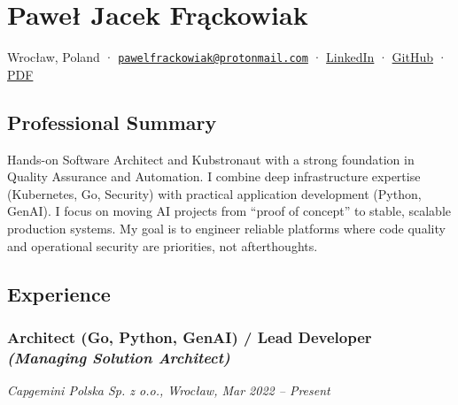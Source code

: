 \documentclass[10pt,a4paper]{article}
\begin{document}
\section{Paweł Jacek Frąckowiak}\label{paweux142-jacek-frux105ckowiak}

Wrocław, Poland ·
\href{mailto:pawelfrackowiak@protonmail.com}{\nolinkurl{pawelfrackowiak@protonmail.com}}
· \href{https://linkedin.com/in/pawelfrackowiak}{LinkedIn} ·
\href{https://github.com/pfrack}{GitHub} · \href{files/cv.pdf}{PDF}

\subsection{Professional Summary}\label{professional-summary}

Hands-on Software Architect and Kubstronaut with a strong foundation in
Quality Assurance and Automation. I combine deep infrastructure
expertise (Kubernetes, Go, Security) with practical application
development (Python, GenAI). I focus on moving AI projects from ``proof
of concept'' to stable, scalable production systems. My goal is to
engineer reliable platforms where code quality and operational security
are priorities, not afterthoughts.

\subsection{Experience}\label{experience}

\subsubsection{\texorpdfstring{Architect (Go, Python, GenAI) / Lead
Developer \emph{(Managing Solution
Architect)}}{Architect (Go, Python, GenAI) / Lead Developer (Managing Solution Architect)}}\label{architect-go-python-genai-lead-developer-managing-solution-architect}

\emph{Capgemini Polska Sp. z o.o., Wrocław, Mar 2022 -- Present}
\end{document}
